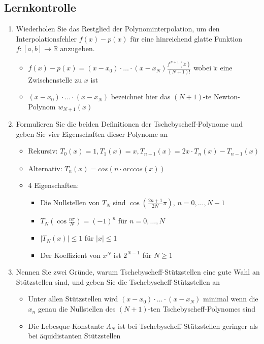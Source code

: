 \documentclass[]{article}
\begin{document}
\subsection{Lernkontrolle}
	\begin{enumerate}
		\item Wiederholen Sie das Restglied der Polynominterpolation, um den Interpolationsfehler $f(x)-p(x)$ für eine hinreichend glatte Funktion $f: [a,b]\rightarrow \mathbb{R}$ anzugeben. 
			\begin{itemize}
				\item $f(x) - p(x) = (x-x_0) \cdot \dots \cdot (x-x_{N}) \frac{f^{N+1}(\tilde{x})}{(N+1)!}$ wobei $\tilde{x}$ eine Zwischenstelle zu $x$ ist
                \item $(x-x_0) \cdot \dots \cdot (x-x_{N})$ bezeichnet hier das $(N+1)$-te Newton-Polynom $w_{N + 1}(x)$
			\end{itemize}
		\item Formulieren Sie die beiden Definitionen der Tschebyscheff-Polynome und geben Sie vier Eigenschaften dieser Polynome an
			\begin{itemize}
				\item Rekursiv: $T_0(x) = 1, T_1(x) = x, T_{n+1}(x) = 2x \cdot T_n(x) - T_{n-1}(x)$
				\item Alternativ: $T_n(x) = cos(n \cdot arccos(x))$
				\item 4 Eigenschaften:
				\begin{itemize}
					\item Die Nullstellen von $T_N$ sind $\cos\left(\frac{2n+1}{2N} \pi\right)$, $n = 0, \dots, N - 1$
                    \item $T_N\left(\cos \frac{n \pi}{N}\right) = (-1)^n$ für $n = 0,\dots,N$
                    \item $|T_N(x)| \leq 1$ für $|x| \leq 1$
                    \item Der Koeffizient von $x^N$ ist $2^{N - 1}$ für $N \geq 1$
				\end{itemize}
			\end{itemize}
		\item Nennen Sie zwei Gründe, warum Tschebyscheff-Stützstellen eine gute Wahl an Stützstellen sind, und geben Sie die Tschebyscheff-Stützstellen an
			\begin{itemize}
				\item Unter allen Stützstellen wird $(x-x_0) \cdot \dots \cdot (x-x_{N})$ minimal wenn die $x_n$ genau die Nullstellen des $(N+1)$-ten Tschebyscheff-Polynomes sind
				\item Die Lebesque-Konstante $\Lambda_N$ ist bei Tschebyscheff-Stützstellen geringer als bei äquidistanten Stützstellen

\end{itemize}
\end{enumerate}
\end{document}
